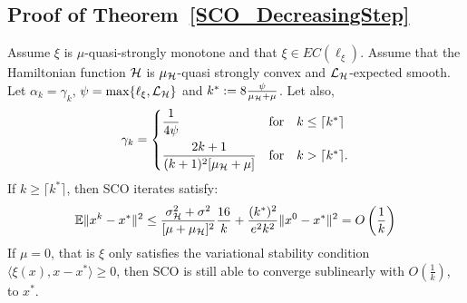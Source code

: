 \documentclass{article}
\begin{document}
\subsection{Proof of Theorem~\ref{SCO_DecreasingStep}}
\label{ProofSCO_DecreasingStep}

\begin{theorem}
\label{Appendix_SCO_DecreasingStep}
Assume $\xi$ is $\mu$-quasi-strongly monotone and that $\xi \in EC( \ell_{\xi})$. Assume that the Hamiltonian function ${\cal H}$ is $\mu_{{\cal H}}$-quasi strongly convex and ${\cal L}_{{\cal H}}$-expected smooth. Let $\alpha_k=\gamma_k$,  $\psi= \max\{  \ell_{\xi},{\cal L}_{{\cal H}}\}$ and $k^* := 8 \frac{\psi}{\mu_{{\cal H}}+\mu}$. Let also, 
\begin{equation}
\gamma_k= 
\begin{cases}
\displaystyle \frac{1}{4 \psi} & \mbox{for}\quad k \leq \lceil k^* \rceil  \\[0.3cm]
\displaystyle \frac{2k+1}{(k+1)^2 [\mu_{{\cal H}}+\mu]}&  \mbox{for}\quad k >  \lceil k^* \rceil.
\end{cases}
\end{equation}
If $k \geq  \lceil k^* \rceil$, then SCO iterates satisfy:
\begin{equation}
\mathbb{E}\| x^{k} - x^*\|^2 \le   \frac{\sigma_{{\cal H}}^2 +\sigma^2}{[\mu + \mu_{{\cal H}}]^2}\frac{16 }{k} + \frac{(k^*)^2 }{e^2 k^2}  \|x^0 - x^*\|^2 = O\left(\frac{1}{k}\right)
\end{equation}
If $\mu=0$, that is $\xi$ only satisfies the variational stability condition $\langle\xi(x),x-x^*\rangle \geq0$, then SCO is still able to converge sublinearly with $O\left(\frac{1}{k}\right)$, to $x^*$.
\end{theorem}
\end{document}
